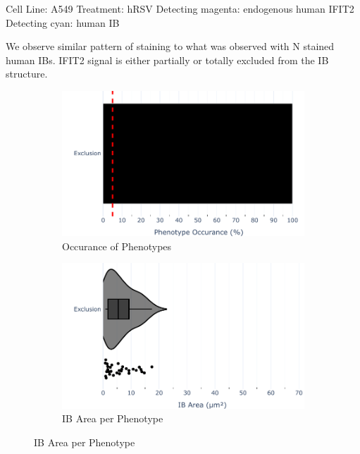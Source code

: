 Cell Line: A549 \newline
Treatment: hRSV \newline
Detecting magenta: endogenous human IFIT2  \newline
Detecting cyan: human IB  \newline

We observe similar pattern of staining to what was observed with N stained human IBs. IFIT2 signal is either partially or totally excluded from the IB structure.

\begin{figure}
    \begin{subfigure}{0.5\textwidth}
    \includegraphics[width=1\linewidth]{10. Chapter 5/Figs/01. Infection/02. IFIT2B/07. bar_i2b_a549-m21.pdf} 
    \caption[]{Occurance of Phenotypes}
    \end{subfigure}
    \begin{subfigure}{0.5\textwidth}
    \includegraphics[width=1\linewidth]{10. Chapter 5/Figs/01. Infection/02. IFIT2B/08. violin_i2b_a549-m21.pdf}
    \caption[]{IB Area per Phenotype}
    \end{subfigure}


\end{figure}
